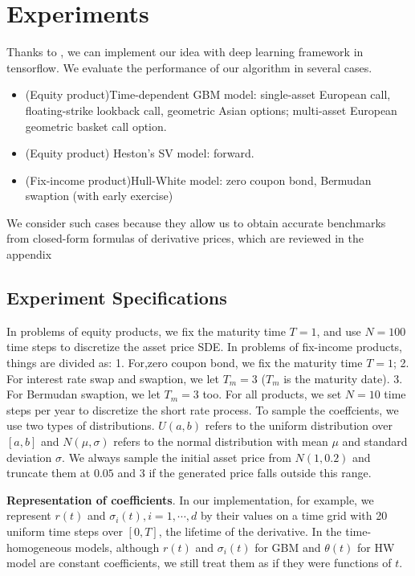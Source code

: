\documentclass[11pt,a4paper]{article}
\theoremstyle{remark}
\begin{document}
	
	
	
	
	\section{Experiments}\label{sec:numerics}
	Thanks to \cite{tensorflow2015-whitepaper}, we can implement our idea with deep learning framework in tensorflow.  We evaluate the performance of our algorithm in several cases. 
	\begin{itemize}
		\item (Equity product)Time-dependent GBM model: single-asset European call, floating-strike lookback call, geometric Asian options; multi-asset European geometric basket call option. 
		
		\item (Equity product) Heston's SV model: forward.
		
		\item (Fix-income product)Hull-White model: zero coupon bond, Bermudan swaption (with early exercise)
	\end{itemize}
	We consider such cases because they allow us to obtain accurate benchmarks from closed-form formulas of derivative prices, which are reviewed in the appendix  
	
	
	\subsection{Experiment Specifications}
	
	In problems of equity products, we fix the maturity time $T=1$, and use $N=100$ time steps to discretize the asset price SDE. 
	In problems of fix-income products, things are divided as: 1. For,zero coupon bond, we fix the  maturity time $T=1$; 2. For interest rate swap and swaption, we let $T_m = 3$ ($T_m$ is the maturity date). 3. For Bermudan swaption, we let $T_m = 3$ too. For all products, we set  $N=10$ time steps per year to discretize the short rate process.
	To sample the coeffcients, we use two types of distributions. $U(a,b)$ refers to the uniform distribution over $[a,b]$ and $N(\mu,\sigma)$ refers to the normal distribution with mean $\mu$ and standard deviation $\sigma$. We always sample the initial asset price from $N(1, 0.2)$ and truncate them at $0.05$ and $3$ if the generated price falls outside this range.
	
	\smallskip
	\noindent\textbf{Representation of coefficients}. In our implementation,  for example,  we represent $r(t)$ and $\sigma_i(t), i=1,\cdots,d$ by their values on a time grid with 20 uniform time steps over $[0,T]$, the lifetime of the derivative. In the time-homogeneous models, although $r(t)$ and $\sigma_i(t)$ for GBM and $\theta(t)$ for HW model are constant coefficients, we still treat them as if they were functions of $t$. 
	
\end{document}
